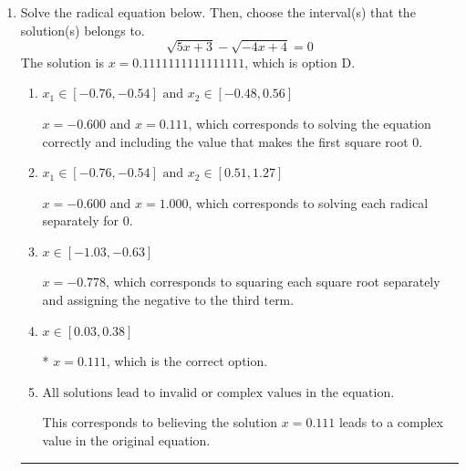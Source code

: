 \documentclass{extbook}[14pt]
\newcommand{\litem}[1]{\item #1

\rule{\textwidth}{0.4pt}}
\begin{document}
\begin{enumerate}\litem{
Solve the radical equation below. Then, choose the interval(s) that the solution(s) belongs to.
\[ \sqrt{5 x + 3} - \sqrt{-4 x + 4} = 0 \]The solution is \( x = 0.1111111111111111 \), which is option D.\begin{enumerate}[label=\Alph*.]
\item \( x_1 \in [-0.76, -0.54] \text{ and } x_2 \in [-0.48,0.56] \)

$x = -0.600$ and $x = 0.111$, which corresponds to solving the equation correctly and including the value that makes the first square root 0.
\item \( x_1 \in [-0.76, -0.54] \text{ and } x_2 \in [0.51,1.27] \)

$x = -0.600$ and $x = 1.000$, which corresponds to solving each radical separately for 0.
\item \( x \in [-1.03,-0.63] \)

$x = -0.778$, which corresponds to squaring each square root separately and assigning the negative to the third term.
\item \( x \in [0.03,0.38] \)

* $x = 0.111$, which is the correct option.
\item \( \text{All solutions lead to invalid or complex values in the equation.} \)

This corresponds to believing the solution $x = 0.111$ leads to a complex value in the original equation.
\end{enumerate}

}
\end{enumerate}
\end{document}
